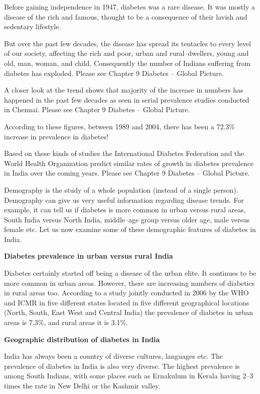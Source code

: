 
Before gaining independence in 1947, diabetes was a rare disease. It was mostly a disease of the rich and famous, thought to be a consequence of their lavish and sedentary lifestyle.

But over the past few decades, the disease has spread its tentacles to every level of our society, affecting the rich and poor, urban and rural–dwellers, young and old, man, woman, and child. Consequently the number of Indians suffering from diabetes has exploded. Please see Chapter 9 Diabetes – Global Picture.

A closer look at the trend shows that majority of the increase in numbers has happened in the past few decades as seen in serial prevalence studies conducted in Chennai. Please see Chapter 9 Diabetes – Global Picture.

According to these figures, between 1989 and 2004, there has been a 72.3\% increase in prevalence in diabetes!

Based on these kinds of studies the International Diabetes Federation and the World Health Organization predict similar rates of growth in diabetes prevalence in India over the coming years. Please see Chapter 9 Diabetes – Global Picture.


Demography is the study of a whole population (instead of a single person). Demography can give us very useful information regarding disease trends. For example, it can tell us if diabetes is more common in urban versus rural areas, South India versus North India, middle–age group versus older age, male versus female etc. Let us now examine some of these demographic features of diabetes in India.

\textbf{Diabetes prevalence in urban versus rural India}

Diabetes certainly started off being a disease of the urban elite. It continues to be more common in urban areas. However, there are increasing numbers of diabetics in rural areas too. According to a study jointly conducted in 2006 by the WHO and ICMR in five different states located in five different geographical locations (North, South, East West and Central India) the prevalence of diabetes in urban areas is 7.3\%, and rural areas it is 3.1\%.

\textbf{Geographic distribution of diabetes in India}

India has always been a country of diverse cultures, languages etc. The prevalence of diabetes in India is also very diverse. The highest prevalence is among South Indians, with some places such as Ernakulum in Kerala having 2–3 times the rate in New Delhi or the Kashmir valley.

